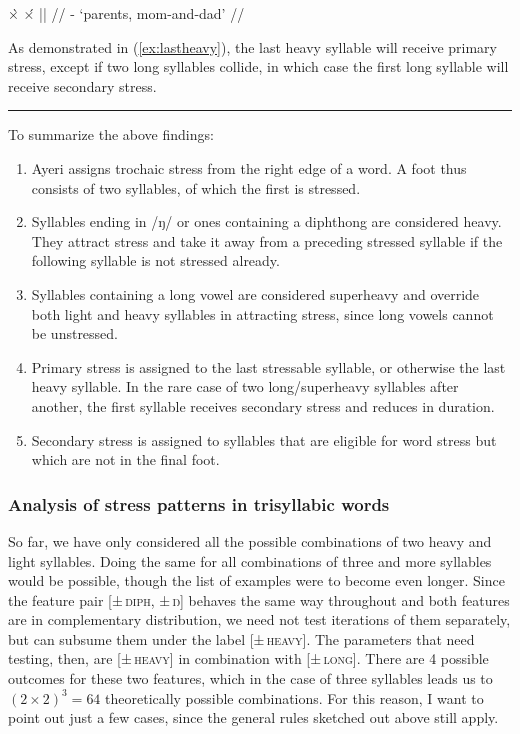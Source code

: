 \a\begingl
	\gla ×̀		{}	×́		||	{} //
	\glb {}	-			{}	{`parents, 
		mom-and-dad'} //
\endgl
\xe

As demonstrated in (\ref{ex:lastheavy}), the last heavy syllable will receive 
primary stress, except if two long syllables collide, in which case the first 
long syllable will receive secondary stress.

\plainbreak{1}

To summarize the above findings:

\begin{enumerate}\label{2sylsumm}
\item Ayeri assigns trochaic stress from the right edge of a word. A foot 
	thus consists of two syllables, of which the first is stressed.
\item Syllables ending in /ŋ/ or ones containing a diphthong are considered 
	heavy. They attract stress and take it away from a preceding stressed 
	syllable if the following syllable is not stressed already.
\item Syllables containing a long vowel are considered superheavy and override 
	both light and heavy syllables in attracting stress, since long vowels 
	cannot be unstressed.
\item Primary stress is assigned to the last stressable syllable, or otherwise 
	the last heavy syllable. In the rare case of two long/superheavy 
	syllables after another, the first syllable receives secondary stress 
	and reduces in duration.
\item Secondary stress is assigned to syllables that are eligible for word 
	stress but which are not in the final foot.
\end{enumerate}

\subsubsection{Analysis of stress patterns in trisyllabic words}

So far, we have only considered all the possible combinations of two heavy and 
light syllables. Doing the same for all combinations of three and more syllables 
would be possible, though the list of examples were to become even longer. 
Since the feature pair \textsc{[±\,diph, ±\,ŋ]} behaves the same way throughout 
and both features are in complementary distribution, we need not test 
iterations of them separately, but can subsume them under the label 
\textsc{[±\,heavy]}. The parameters that need testing, then, are 
\textsc{[±\,heavy]} in combination with \textsc{[±\,long]}. There are 4 
possible outcomes for these two features, which in the case of three syllables 
leads us to $(2 \times 2) ^ 3 = 64$ theoretically possible combinations. For 
this reason, I want to point out just a few cases, since the general rules 
sketched out above still apply. 

